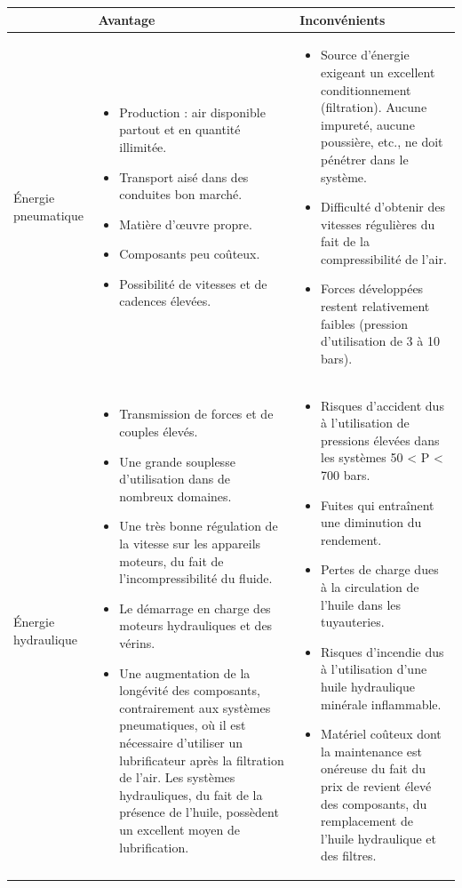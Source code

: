 \documentclass[10pt]{article}
\begin{document}
\begin{center}
\begin{tabular}{|l|p{}|p{}|}
\hline
& Avantage & Inconvénients \\
\hline
\hline
Énergie  pneumatique &
\begin{itemize}
\item Production : air disponible partout et en quantité illimitée.
\item Transport aisé dans des conduites bon marché.
\item Matière d’œuvre propre.
\item Composants peu coûteux.
\item Possibilité de vitesses et de cadences élevées.
\end{itemize}
&
\begin{itemize}
\item Source d'énergie exigeant un excellent conditionnement (filtration). Aucune impureté, aucune poussière, etc., ne doit pénétrer dans le système.
\item Difficulté d'obtenir des vitesses régulières du fait de la compressibilité de l'air.
\item Forces développées restent relativement faibles (pression d’utilisation de 3 à 10 bars).
\end{itemize}
 \\
\hline
Énergie hydraulique & 
\begin{itemize}
\item Transmission de forces et de couples élevés.
\item Une grande souplesse d'utilisation dans de nombreux domaines.
\item Une très bonne régulation de la vitesse sur les appareils moteurs, du fait de l'incompressibilité du fluide.
\item Le démarrage en charge des moteurs hydrauliques et des vérins.
\item Une augmentation de la longévité des composants, contrairement aux systèmes pneumatiques, où il est nécessaire d'utiliser un lubrificateur après la filtration de l'air. Les systèmes hydrauliques, du fait de la présence de l'huile, possèdent un excellent moyen de lubrification.
\end{itemize}&
\begin{itemize}
\item Risques d'accident dus à l'utilisation de pressions élevées dans les systèmes 50 < P < 700 bars.
\item Fuites qui entraînent une diminution du rendement.
\item Pertes de charge dues à la circulation de l'huile dans les tuyauteries.
\item Risques d'incendie dus à l'utilisation d'une huile hydraulique minérale inflammable.
\item Matériel coûteux dont la maintenance est onéreuse du fait du prix de revient élevé des composants, du remplacement de l'huile hydraulique et des filtres.
\end{itemize}
\\
\hline
\end{tabular}
\end{center}
\end{document}
